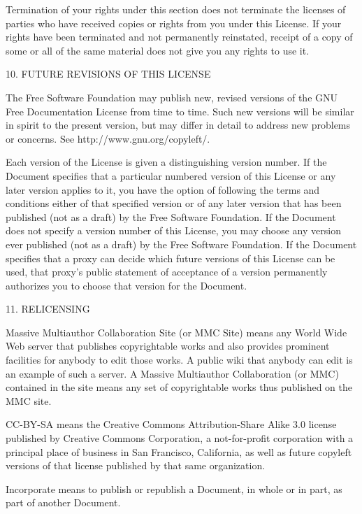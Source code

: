 Termination of your rights under this section does not terminate the
licenses of parties who have received copies or rights from you under
this License. If your rights have been terminated and not permanently
reinstated, receipt of a copy of some or all of the same material
does not give you any rights to use it.

10. FUTURE REVISIONS OF THIS LICENSE

The Free Software Foundation may publish new, revised versions of
the GNU Free Documentation License from time to time. Such new versions
will be similar in spirit to the present version, but may differ in
detail to address new problems or concerns. See http://www.gnu.org/copyleft/.

Each version of the License is given a distinguishing version number.
If the Document specifies that a particular numbered version of this
License \textquotedbl{}or any later version\textquotedbl{} applies
to it, you have the option of following the terms and conditions either
of that specified version or of any later version that has been published
(not as a draft) by the Free Software Foundation. If the Document
does not specify a version number of this License, you may choose
any version ever published (not as a draft) by the Free Software Foundation.
If the Document specifies that a proxy can decide which future versions
of this License can be used, that proxy's public statement of acceptance
of a version permanently authorizes you to choose that version for
the Document.

11. RELICENSING

\textquotedbl{}Massive Multiauthor Collaboration Site\textquotedbl{}
(or \textquotedbl{}MMC Site\textquotedbl{}) means any World Wide Web
server that publishes copyrightable works and also provides prominent
facilities for anybody to edit those works. A public wiki that anybody
can edit is an example of such a server. A \textquotedbl{}Massive
Multiauthor Collaboration\textquotedbl{} (or \textquotedbl{}MMC\textquotedbl{})
contained in the site means any set of copyrightable works thus published
on the MMC site.

\textquotedbl{}CC-BY-SA\textquotedbl{} means the Creative Commons
Attribution-Share Alike 3.0 license published by Creative Commons
Corporation, a not-for-profit corporation with a principal place of
business in San Francisco, California, as well as future copyleft
versions of that license published by that same organization.

\textquotedbl{}Incorporate\textquotedbl{} means to publish or republish
a Document, in whole or in part, as part of another Document.

